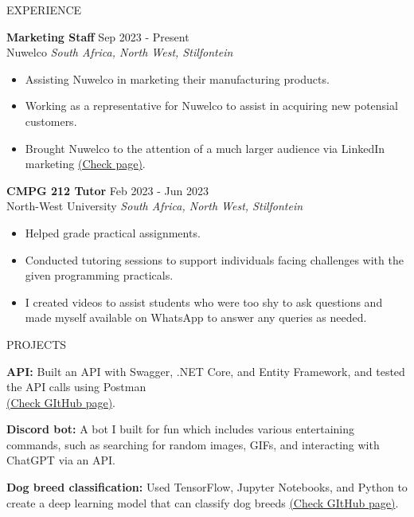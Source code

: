 \documentclass{resume} %
\begin{document}
\begin{rSection}{EXPERIENCE}

\textbf{Marketing Staff} \hfill Sep 2023 - Present\\
Nuwelco \hfill \textit{South Africa, North West, Stilfontein}
\begin{itemize}
    \itemsep -3pt {} 
    \item Assisting Nuwelco in marketing their manufacturing products.
    \item Working as a representative for Nuwelco to assist in acquiring new potensial customers.
    \item Brought Nuwelco to the attention of a much larger audience via LinkedIn marketing \href{https://www.linkedin.com/company/98936614/admin/feed/posts/}{(Check page)}.
\end{itemize}

\textbf{CMPG 212 Tutor} \hfill Feb 2023 - Jun 2023\\
North-West University \hfill \textit{South Africa, North West, Stilfontein}
\begin{itemize}
    \itemsep -3pt {} 
    \item Helped grade practical assignments.
    \item Conducted tutoring sessions to support individuals facing challenges with the given programming practicals.
    \item I created videos to assist students who were too shy to ask questions and made myself available on WhatsApp to answer any queries as needed.
\end{itemize}

\end{rSection} 


\begin{rSection}{PROJECTS}
\vspace{-1.25em}
\item \textbf{API:} {Built an API with Swagger, .NET Core, and Entity Framework, and tested the API calls using Postman\\ \href{https://github.com/XoXoTheFrozenFox/CMPG323_Project2_39909476}{(Check GItHub page)}}.
\item \textbf{Discord bot:} {A bot I built for fun which includes various entertaining commands, such as searching for random images, GIFs, and interacting with ChatGPT via an API.}
\item \textbf{Dog breed classification:} {Used TensorFlow, Jupyter Notebooks, and Python to create a deep learning model that can classify dog breeds \href{https://github.com/XoXoTheFrozenFox/Dog_Breed_Classfication}{(Check GItHub page)}}.
\end{rSection} 
\end{document}
